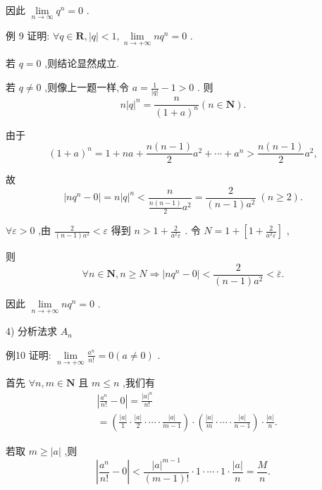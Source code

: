 因此 $\mathop{\lim }\limits_{{n \rightarrow  \infty }}{q}^{n} = 0$ .

例 9 证明: $\forall q \in  \mathbf{R},\left| q\right|  < 1,\mathop{\lim }\limits_{{n \rightarrow   + \infty }}n{q}^{n} = 0$ .

若 $q = 0$ ,则结论显然成立.

若 $q \neq  0$ ,则像上一题一样,令 $a = \frac{1}{\left| q\right| } - 1 > 0$ . 则
$$n{\left| q\right| }^{n} = \frac{n}{{\left( 1 + a\right) }^{n}}\left( {n \in  \mathbf{N}}\right) .$$

由于
$${\left( 1 + a\right) }^{n} = 1 + {na} + \frac{n\left( {n - 1}\right) }{2}{a}^{2} + \cdots  + {a}^{n} > \frac{n\left( {n - 1}\right) }{2}{a}^{2},$$

故
$$\left| {n{q}^{n} - 0}\right|  = n{\left| q\right| }^{n} < \frac{n}{\frac{n\left( {n - 1}\right) }{2}{a}^{2}} = \frac{2}{\left( {n - 1}\right) {a}^{2}}\;\left( {n \geq  2}\right) .$$

$\forall \varepsilon  > 0$ ,由 $\frac{2}{\left( {n - 1}\right) {a}^{2}} < \varepsilon$ 得到 $n > 1 + \frac{2}{{a}^{2}\varepsilon }$ . 令 $N = 1 + \left\lbrack  {1 + \frac{2}{{a}^{2}\varepsilon }}\right\rbrack$ ,

则
$$\forall n \in  \mathbf{N},n \geq  N \Rightarrow  \left| {n{q}^{n} - 0}\right|  < \frac{2}{\left( {n - 1}\right) {a}^{2}} < \bar{\varepsilon }.$$

因此 $\mathop{\lim }\limits_{{n \rightarrow   + \infty }}n{q}^{n} = 0$ .

4) 分析法求 ${A}_{n}$

例10 证明: $\mathop{\lim }\limits_{{n \rightarrow   + \infty }}\frac{{a}^{n}}{n!} = 0\left( {a \neq  0}\right)$ .

首先 $\forall n,m \in  \mathbf{N}$ 且 $m \leq  n$ ,我们有
\begin{align*}
	&\left| {\frac{{a}^{n}}{n!} - 0}\right|  = \frac{{\left| a\right| }^{n}}{n!}\\
	&= \left( {\frac{\left| a\right| }{1} \cdot  \frac{\left| a\right| }{2} \cdot  \cdots  \cdot  \frac{\left| a\right| }{m - 1}}\right)  \cdot  \left( {\frac{\left| a\right| }{m} \cdot  \cdots  \cdot  \frac{\left| a\right| }{n - 1}}\right)  \cdot  \frac{\left| a\right| }{n}.
\end{align*}

若取 $m \geq  \left| a\right|$ ,则
$$\left| {\frac{{a}^{n}}{n!} - 0}\right|  < \frac{{\left| a\right| }^{m - 1}}{\left( {m - 1}\right) !} \cdot  1 \cdot  \cdots  \cdot  1 \cdot  \frac{\left| a\right| }{n} = \frac{M}{n}.$$

